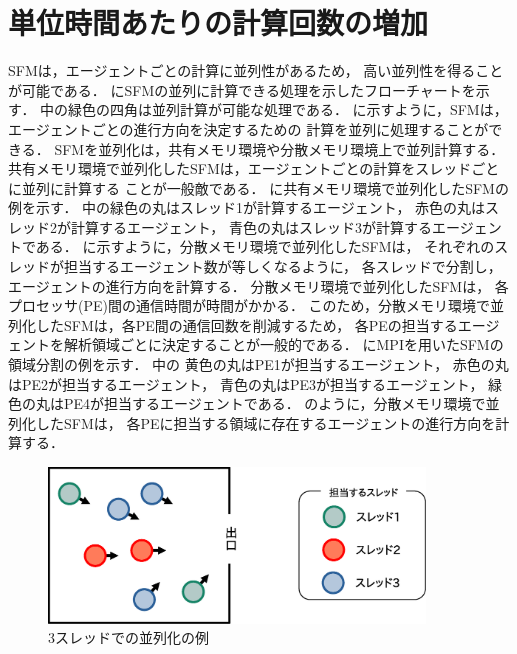\section{単位時間あたりの計算回数の増加}
SFMは，エージェントごとの計算に並列性があるため，
高い並列性を得ることが可能である．
にSFMの並列に計算できる処理を示したフローチャートを示す．
中の緑色の四角は並列計算が可能な処理である．
に示すように，SFMは，エージェントごとの進行方向を決定するための
計算を並列に処理することができる．
SFMを並列化は，共有メモリ環境や分散メモリ環境上で並列計算する．
共有メモリ環境で並列化したSFMは，エージェントごとの計算をスレッドごとに並列に計算する
ことが一般敵である\cite{seru_sfm1}\cite{seru_sfm2}．
に共有メモリ環境で並列化したSFMの例を示す．
中の緑色の丸はスレッド1が計算するエージェント，
赤色の丸はスレッド2が計算するエージェント，
青色の丸はスレッド3が計算するエージェントである．
に示すように，分散メモリ環境で並列化したSFMは，
それぞれのスレッドが担当するエージェント数が等しくなるように，
各スレッドで分割し，エージェントの進行方向を計算する．
分散メモリ環境で並列化したSFMは，
各プロセッサ(PE)間の通信時間が時間がかかる．
このため，分散メモリ環境で並列化したSFMは，各PE間の通信回数を削減するため，
各PEの担当するエージェントを解析領域ごとに決定することが一般的である．
にMPIを用いたSFMの領域分割の例を示す．
中の
黄色の丸はPE1が担当するエージェント，
赤色の丸はPE2が担当するエージェント，
青色の丸はPE3が担当するエージェント，
緑色の丸はPE4が担当するエージェントである．
のように，分散メモリ環境で並列化したSFMは，
各PEに担当する領域に存在するエージェントの進行方向を計算する．

\begin{figure}[t]
 \begin{center}
  \includegraphics[width=10cm,clip]{figure/sureddo_heiretu.eps}
  \caption{3スレッドでの並列化の例}
  \label{fig:agent_heiretu}
 \end{center}
\end{figure}


